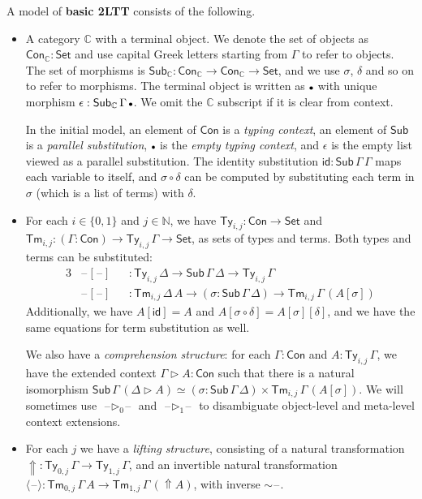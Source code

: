 \documentclass[acmsmall,review]{acmart}
\newcommand{\msf}[1]{\mathsf{#1}}
\newcommand{\mbb}[1]{\mathbb{#1}}
\newcommand{\ext}{\triangleright}
\newcommand{\Lift}{{\Uparrow}}
\newcommand{\spl}{{\sim}}
\newcommand{\qut}[1]{\langle #1\rangle}
\newcommand{\mbbc}{\mbb{C}}
\newcommand{\Con}{\msf{Con}}
\newcommand{\Sub}{\msf{Sub}}
\newcommand{\Ty}{\msf{Ty}}
\newcommand{\Tm}{\msf{Tm}}
\newcommand{\emptycon}{\scaleobj{.75}\bullet}
\newcommand{\id}{\msf{id}}
\newcommand{\Set}{\mathsf{Set}}
\newcommand{\blank}{{\mathord{\hspace{1pt}\text{--}\hspace{1pt}}}}
\theoremstyle{remark}
\begin{document}
\begin{definition} A model of \textbf{basic 2LTT} consists of the following.
\begin{itemize}
\item
  A category $\mbbc$ with a terminal object. We denote the set of objects as
  $\Con_{\mbbc} : \Set$ and use capital Greek letters starting from $\Gamma$ to
  refer to objects. The set of morphisms is $\Sub_{\mbbc} : \Con_{\mbbc} \to
  \Con_{\mbbc} \to \Set$, and we use $\sigma$, $\delta$ and so on to refer to
  morphisms. The terminal object is written as $\emptycon$ with unique morphism
  $\epsilon : \Sub_\mbbc\,\Gamma\,\emptycon$. We omit the $\mbbc$ subscript if
  it is clear from context.

  In the initial model, an element of $\Con$ is a \emph{typing context}, an
  element of $\Sub$ is a \emph{parallel substitution}, $\emptycon$ is the
  \emph{empty typing context}, and $\epsilon$ is the empty list viewed as a
  parallel substitution. The identity substitution $\id : \Sub\,\Gamma\,\Gamma$
  maps each variable to itself, and $\sigma \circ \delta$ can be computed
  by substituting each term in $\sigma$ (which is a list of terms) with $\delta$.
\item
  For each $i \in \{0,1\}$ and $j \in \mbb{N}$, we have $\Ty_{i,j} : \Con \to
  \Set$ and $\Tm_{i,j} : (\Gamma : \Con) \to \Ty_{i,j}\,\Gamma \to \Set$, as
  sets of types and terms. Both types and terms can be substituted:
  \begin{alignat*}{3}
    & \blank\![\blank\!] &&: \Ty_{i,j}\,\Delta \to \Sub\,\Gamma\,\Delta \to \Ty_{i,j}\,\Gamma \\
    & \blank\![\blank\!] &&: \Tm_{i,j}\,\Delta\,A \to (\sigma : \Sub\,\Gamma\,\Delta) \to \Tm_{i,j}\,\Gamma\,(A[\sigma])
  \end{alignat*}
  Additionally, we have $A[\id] = A$ and $A[\sigma \circ \delta] =
  A[\sigma][\delta]$, and we have the same equations for term substitution as
  well.

  We also have a \emph{comprehension structure}: for each $\Gamma : \Con$
  and $A : \Ty_{i,j}\,\Gamma$, we have the extended context $\Gamma \ext A :
  \Con$ such that there is a natural isomorphism $\Sub\,\Gamma\,(\Delta\ext A)
  \simeq (\sigma : \Sub\,\Gamma\,\Delta) \times
  \Tm_{i,j}\,\Gamma\,(A[\sigma])$. We will sometimes use
  $\blank\!\ext_0\!\blank$ and $\blank\!\ext_1\!\blank$ to disambiguate
  object-level and meta-level context extensions.
\item
  For each $j$ we have a \emph{lifting structure}, consisting of a natural
  transformation $\Lift : \Ty_{0,j}\,\Gamma \to \Ty_{1,j}\,\Gamma$, and an
  invertible natural transformation $\qut{\blank} : \Tm_{0,j}\,\Gamma\,A \to
  \Tm_{1,j}\,\Gamma\,(\Lift A)$, with inverse $\spl\blank$.
\end{itemize}
\end{definition}
\end{document}
